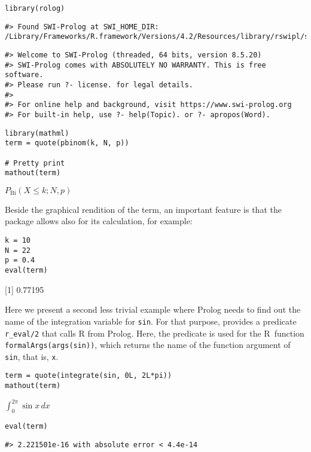 \begin{verbatim}
library(rolog)
\end{verbatim}

\begin{verbatim}
#> Found SWI-Prolog at SWI_HOME_DIR: /Library/Frameworks/R.framework/Versions/4.2/Resources/library/rswipl/swipl/lib/swipl
\end{verbatim}

\begin{verbatim}
#> Welcome to SWI-Prolog (threaded, 64 bits, version 8.5.20)
#> SWI-Prolog comes with ABSOLUTELY NO WARRANTY. This is free software.
#> Please run ?- license. for legal details.
#> 
#> For online help and background, visit https://www.swi-prolog.org
#> For built-in help, use ?- help(Topic). or ?- apropos(Word).
\end{verbatim}

\begin{verbatim}
library(mathml)
term = quote(pbinom(k, N, p))

# Pretty print
mathout(term)
\end{verbatim}

\({{{P}_\mathrm{Bi}}\left({{{X}\le{k}}{;{{N}{,{p}}}}}\right)}\)

Beside the graphical rendition of the term, an important feature is that the package allows also for its calculation, for example:

\begin{verbatim}
k = 10
N = 22
p = 0.4
eval(term)
\end{verbatim}

{[}1{]} 0.77195

Here we present a second less trivial example where Prolog needs to find out the name of
the integration variable for \texttt{sin}. For that purpose,  provides a predicate \texttt{r\_eval/2} that calls R from Prolog. Here, the predicate is used for the R~function \texttt{formalArgs(args(sin))}, which returns the name of the function argument of \texttt{sin}, that is, \texttt{x}.

\begin{verbatim}
term = quote(integrate(sin, 0L, 2L*pi))
mathout(term)
\end{verbatim}

\(\int_{{0}}^{{{2}{}\pi}}{{\sin{x}}}\,{d{x}}\)

\begin{verbatim}
eval(term)
\end{verbatim}

\begin{verbatim}
#> 2.221501e-16 with absolute error < 4.4e-14
\end{verbatim}

